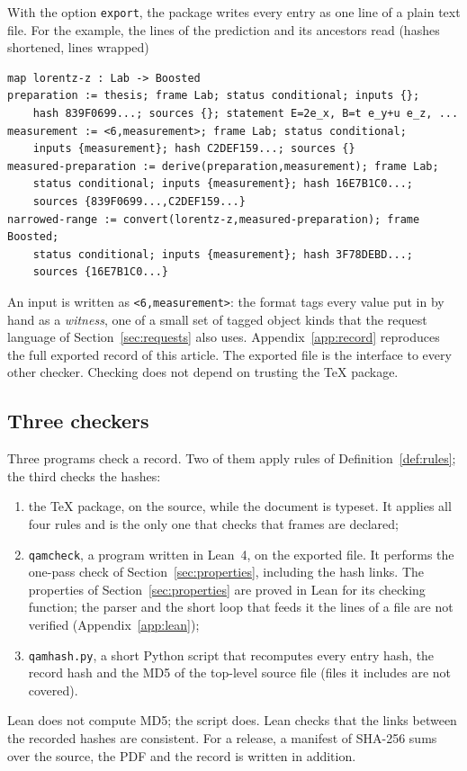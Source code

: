 With the option \texttt{export}, the package writes every entry as one line of a plain text file. For the example, the lines of the
prediction and its ancestors read (hashes shortened, lines wrapped)
\begin{lstlisting}
map lorentz-z : Lab -> Boosted
preparation := thesis; frame Lab; status conditional; inputs {};
    hash 839F0699...; sources {}; statement E=2e_x, B=t e_y+u e_z, ...
measurement := <6,measurement>; frame Lab; status conditional;
    inputs {measurement}; hash C2DEF159...; sources {}
measured-preparation := derive(preparation,measurement); frame Lab;
    status conditional; inputs {measurement}; hash 16E7B1C0...;
    sources {839F0699...,C2DEF159...}
narrowed-range := convert(lorentz-z,measured-preparation); frame Boosted;
    status conditional; inputs {measurement}; hash 3F78DEBD...;
    sources {16E7B1C0...}
\end{lstlisting}
An input is written as \texttt{<6,measurement>}: the format tags every value put in by hand as a \emph{witness}, one of a small
set of tagged object kinds that the request language of Section~\ref{sec:requests} also uses. Appendix~\ref{app:record} reproduces the full exported record of this article. The exported file is the interface to every other
checker. Checking does not depend on trusting the \TeX{} package.

\subsection{Three checkers}

Three programs check a record. Two of them apply rules of
Definition~\ref{def:rules}; the third checks the hashes:
\begin{enumerate}[leftmargin=1.5em]
\item the \TeX{} package, on the source, while the document is typeset. It applies all four rules and is the only one that checks that
frames are declared;
\item \texttt{qamcheck}, a program written in Lean~4, on the exported file. It performs the one-pass check of
Section~\ref{sec:properties}, including the hash links. The properties of Section~\ref{sec:properties} are proved in Lean for its
checking function; the parser and the short loop that feeds it the lines of a file are not verified (Appendix~\ref{app:lean});
\item \texttt{qamhash.py}, a short Python script that recomputes every entry hash, the record hash and the MD5 of the top-level source
file (files it includes are not covered).
\end{enumerate}
Lean does not compute MD5; the script does. Lean checks that the links between the recorded hashes are consistent. For a release, a
manifest of SHA-256 sums over the source, the PDF and the record is written in addition.

